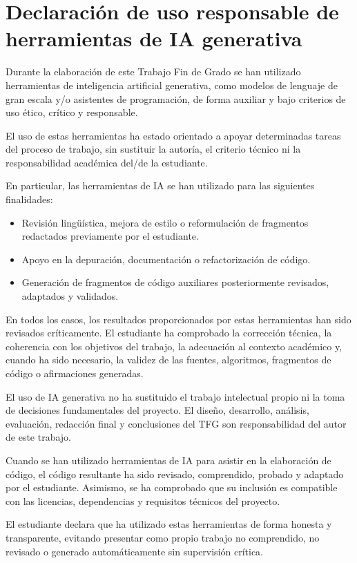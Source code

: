 \chapter{Declaración de uso responsable de herramientas de IA generativa}

Durante la elaboración de este Trabajo Fin de Grado se han utilizado herramientas de inteligencia artificial generativa, como modelos de lenguaje de gran escala y/o asistentes de programación, de forma auxiliar y bajo criterios de uso ético, crítico y responsable.

El uso de estas herramientas ha estado orientado a apoyar determinadas tareas del proceso de trabajo, sin sustituir la autoría, el criterio técnico ni la responsabilidad académica del/de la estudiante.

En particular, las herramientas de IA se han utilizado para las siguientes finalidades:

\begin{itemize}
      \item Revisión lingüística, mejora de estilo o reformulación de fragmentos redactados previamente por el estudiante.
      \item Apoyo en la depuración, documentación o refactorización de código.
      \item Generación de fragmentos de código auxiliares posteriormente revisados, adaptados y validados.
\end{itemize}

En todos los casos, los resultados proporcionados por estas herramientas han sido revisados críticamente. El estudiante ha comprobado la corrección técnica, la coherencia con los objetivos del trabajo, la adecuación al contexto académico y, cuando ha sido necesario, la validez de las fuentes, algoritmos, fragmentos de código o afirmaciones generadas.

El uso de IA generativa no ha sustituido el trabajo intelectual propio ni la toma de decisiones fundamentales del proyecto. El diseño, desarrollo, análisis, evaluación, redacción final y conclusiones del TFG son responsabilidad del autor de este trabajo.

Cuando se han utilizado herramientas de IA para asistir en la elaboración de código, el código resultante ha sido revisado, comprendido, probado y adaptado por el estudiante. Asimismo, se ha comprobado que su inclusión es compatible con las licencias, dependencias y requisitos técnicos del proyecto.

El estudiante declara que ha utilizado estas herramientas de forma honesta y transparente, evitando presentar como propio trabajo no comprendido, no revisado o generado automáticamente sin supervisión crítica.

